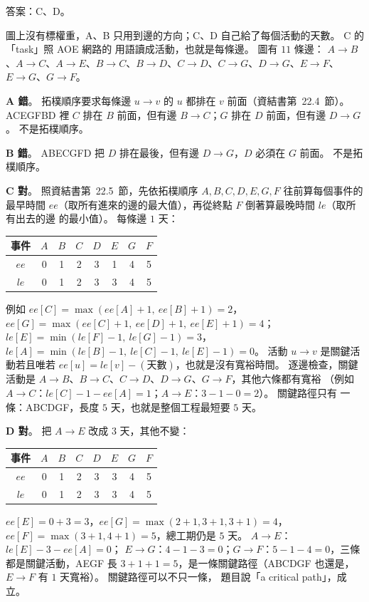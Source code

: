 \begin{pastsoln}
答案：C、D。

圖上沒有標權重，A、B 只用到邊的方向；C、D 自己給了每個活動的天數。 C 的「task」照 AOE 網路的
用語讀成活動，也就是每條邊。 圖有 $11$ 條邊：
$A \to B$、$A \to C$、$A \to E$、$B \to C$、$B \to D$、$C \to D$、$C \to G$、$D \to G$、$E \to F$、
$E \to G$、$G \to F$。

\textbf{A 錯}。 拓樸順序要求每條邊 $u \to v$ 的 $u$ 都排在 $v$ 前面（資結書第~22.4~節）。
ACEGFBD 裡 $C$ 排在 $B$ 前面，但有邊 $B \to C$；$G$ 排在 $D$ 前面，但有邊 $D \to G$。 不是拓樸順序。

\textbf{B 錯}。 ABECGFD 把 $D$ 排在最後，但有邊 $D \to G$，$D$ 必須在 $G$ 前面。 不是拓樸順序。

\textbf{C 對}。 照資結書第~22.5~節，先依拓樸順序 $A, B, C, D, E, G, F$ 往前算每個事件的最早時間
$\mathit{ee}$（取所有進來的邊的最大值），再從終點 $F$ 倒著算最晚時間 $\mathit{le}$（取所有出去的邊
的最小值）。 每條邊 $1$ 天：
\begin{center}
\small
\begin{tabular}{c|ccccccc}
事件 & $A$ & $B$ & $C$ & $D$ & $E$ & $G$ & $F$ \\ \hline
$\mathit{ee}$ & 0 & 1 & 2 & 3 & 1 & 4 & 5 \\
$\mathit{le}$ & 0 & 1 & 2 & 3 & 3 & 4 & 5 \\
\end{tabular}
\end{center}
例如 $\mathit{ee}[C] = \max(\mathit{ee}[A] + 1,\ \mathit{ee}[B] + 1) = 2$，
$\mathit{ee}[G] = \max(\mathit{ee}[C] + 1,\ \mathit{ee}[D] + 1,\ \mathit{ee}[E] + 1) = 4$；
$\mathit{le}[E] = \min(\mathit{le}[F] - 1,\ \mathit{le}[G] - 1) = 3$，
$\mathit{le}[A] = \min(\mathit{le}[B] - 1,\ \mathit{le}[C] - 1,\ \mathit{le}[E] - 1) = 0$。
活動 $u \to v$ 是關鍵活動若且唯若 $\mathit{ee}[u] = \mathit{le}[v] - (\text{天數})$，也就是沒有寬裕時間。
逐邊檢查，關鍵活動是 $A \to B$、$B \to C$、$C \to D$、$D \to G$、$G \to F$，其他六條都有寬裕
（例如 $A \to C$：$\mathit{le}[C] - 1 - \mathit{ee}[A] = 1$；$A \to E$：$3 - 1 - 0 = 2$）。 關鍵路徑只有
一條：ABCDGF，長度 $5$ 天，也就是整個工程最短要 $5$ 天。

\textbf{D 對}。 把 $A \to E$ 改成 $3$ 天，其他不變：
\begin{center}
\small
\begin{tabular}{c|ccccccc}
事件 & $A$ & $B$ & $C$ & $D$ & $E$ & $G$ & $F$ \\ \hline
$\mathit{ee}$ & 0 & 1 & 2 & 3 & 3 & 4 & 5 \\
$\mathit{le}$ & 0 & 1 & 2 & 3 & 3 & 4 & 5 \\
\end{tabular}
\end{center}
$\mathit{ee}[E] = 0 + 3 = 3$，$\mathit{ee}[G] = \max(2 + 1, 3 + 1, 3 + 1) = 4$，$\mathit{ee}[F] =
\max(3 + 1, 4 + 1) = 5$，總工期仍是 $5$ 天。 $A \to E$：$\mathit{le}[E] - 3 - \mathit{ee}[A] = 0$；
$E \to G$：$4 - 1 - 3 = 0$；$G \to F$：$5 - 1 - 4 = 0$，三條都是關鍵活動，AEGF 長
$3 + 1 + 1 = 5$，是一條關鍵路徑（ABCDGF 也還是，$E \to F$ 有 $1$ 天寬裕）。 關鍵路徑可以不只一條，
題目說「a critical path」，成立。
\end{pastsoln}

